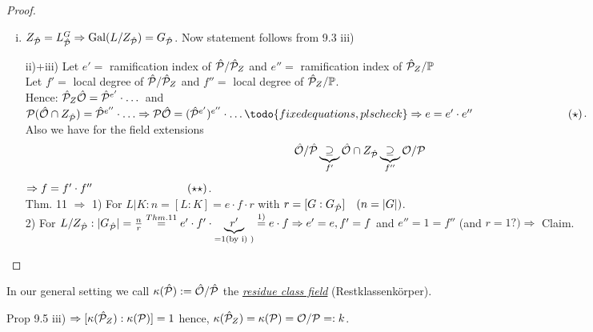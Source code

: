 \begin{proof}
\begin{enumerate}[i)]
\item $Z_{\hat{\mathcal{P}}} = L^G_{\hat{\mathcal{P}}} \Rightarrow \operatorname{Gal}(L/Z_{\hat{\mathcal{P}}}) = G_{\hat{\mathcal{P}}}$. Now statement follows from 9.3 iii)
\item[ii)+iii)]  Let $e'=$ ramification index of $\hat{\mathcal{P}}/\hat{\mathcal{P}}_Z$ and $e'' = $ ramification index of $\hat{\mathcal{P}}_Z/\mathbb{P}$\\
Let $f'=$ local degree of $\hat{\mathcal{P}}/\hat{\mathcal{P}}_Z$ and $f'' = $ local degree of $\hat{\mathcal{P}}_Z/\mathbb{P}$.\\
Hence: $\hat{\mathcal{P}}_Z\hat{\mathcal{O}}=\hat{\mathcal{P}}^{e'}\cdot \dots$ and $\PP(\hO \cap \ZP)= \hP^{e''} \cdot \ldots \Rightarrow \PP \hO = (\hP^{e'})^{e''} \cdot \ldots \todo{fixed equations, pls check}\\ \Rightarrow e=e'\cdot e'' \hspace*{3cm} (\star)$.\\
Also we have for the field extensions
\[ \hat{\mathcal{O}}/\hat{\mathcal{P}} \underbrace{\supseteq}_{f'} \hat{\mathcal{O}}\cap Z_{\hat{\mathcal{P}}} \underbrace{\supseteq}_{f''} \mathcal{O}/\mathcal{P}\]
$\Rightarrow f=f' \cdot f'' \hspace*{3cm} (\star \star)$.\\
Thm. 11 $\Rightarrow$ 1) For $L|K: n=[L:K]=e\cdot f\cdot r$ with $r = [G : G_{\hat{\mathcal{P}}}] \quad (n=|G|)$.\\
2) For $L/Z_{\hat{\mathcal{P}}}: |G_{\hat{\mathcal{P}}}|=\frac{n}{r} \stackrel{Thm. 11}{=} e'\cdot f' \cdot \underbrace{r'}_{=1 \text{(by i) )}} \stackrel{1)}{=} e\cdot f \Rightarrow e'=e, f'=f$ and $e''=1=f''$ (and $r=1 ?) \Rightarrow$ Claim. 
\end{enumerate}
\end{proof}

\begin{defi}
In our general setting we call $\kappa(\hat{\mathcal{P}}):= \hat{\mathcal{O}}/\hat{\mathcal{P}}$ the \emph{\underline{residue class field}} (\glqq Restklassenkörper\grqq).
\end{defi}

\begin{Bem}
Prop 9.5 iii) $\Rightarrow [\kappa(\hat{\mathcal{P}}_Z):\kappa(\mathcal{P})]=1$ hence, $\kappa(\hat{\mathcal{P}}_Z)=\kappa(\mathcal{P})=\mathcal{O}/\mathcal{P}=:k$.
\end{Bem}
